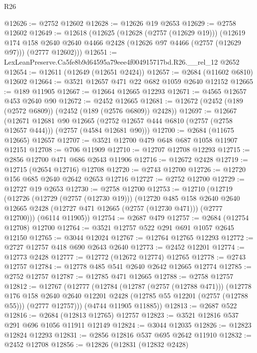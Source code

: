 \begin{lexlean}{R26}
\begin{coremodule}
@12626 := @2752 @12602
@12628 := @12626 @19 @2653
@12629 := @2758 @12602
@12649 := @12618
    (@12625
      (@12628 (@2757 (@12629 @19)))
      (@12619
        @174
        @158
        @2640
        @2640
        @4466
        @2428
        (@12626 @97 @4466 (@2757 (@12629 @97)))
        (@2777 @12602)))
@12651 := LexLeanPreserve.Ca5fe8b9d64595a79eee4f004915717bd.R26.__rel_12 @2652
@12654 := @12611 (@12649 (@12651 @2424))
@12657 := @2684 (@11602 @6810) @12602
@12664 := @3521 @12657 @471 @22 @682 @1059 @2640 @12152
@12665 := @189 @11905
@12667 := @12664 @12665 @12293
@12671 := @4565 @12657 @453 @2640 @90
@12672 := @2452 @12665
@12681 := @12672 (@2452 (@189 (@2572 @6809)) (@2452 (@189 (@2576 @6809)) @2428))
@12697 := @12667
    (@12671
      @12681
      @90
      @12665
      (@2752 @12657 @444 @6810 (@2757 (@2758 @12657 @444)))
      (@2757 (@4584 @12681 @90)))
@12700 := @2684 (@11675 @12665) @12657
@12707 := @3521 @12700 @479 @648 @687 @1058 @11907 @12151
@12708 := @706 @11909
@12710 := @12707 @12708 @12293
@12715 := @2856 @12700 @471 @686 @2643 @11906
@12716 := @12672 @2428
@12719 := @12715 (@2654 @12716) @12708
@12720 := @2743 @12700
@12726 := @12720 @156 @685 @2640 @2642 @2653 @12716
@12727 := @2752 @12700
@12729 := @12727 @19 @2653
@12730 := @2758 @12700
@12753 := @12710
    (@12719
      (@12726
        (@12729 (@2757 (@12730 @19)))
        (@12720
          @485
          @158
          @2640
          @2640
          @12665
          @2428
          (@12727 @471 @12665 (@2757 (@12730 @471)))
          (@2777 @12700)))
      (@6114 @11905))
@12754 := @2687 @479
@12757 := @2684 (@12754 @12708) @12700
@12764 := @3521 @12757 @522 @291 @691 @1057 @2645 @12150
@12765 := @3044 @12024
@12767 := @12764 @12765 @12293
@12772 := @2727 @12757 @418 @690 @2643 @2640
@12773 := @2452 @12201
@12774 := @12773 @2428
@12777 := @12772 (@12672 @12774) @12765
@12778 := @2743 @12757
@12784 := @12778 @485 @541 @2640 @2642 @12665 @12774
@12785 := @2752 @12757
@12787 := @12785 @471 @12665
@12788 := @2758 @12757
@12812 := @12767
    (@12777
      (@12784
        (@12787 (@2757 (@12788 @471)))
        (@12778
          @176
          @158
          @2640
          @2640
          @12201
          @2428
          (@12785 @55 @12201 (@2757 (@12788 @55)))
          (@2777 @12757)))
      (@4744 @11905 @11885))
@12813 := @2687 @522
@12816 := @2684 (@12813 @12765) @12757
@12823 := @3521 @12816 @537 @291 @696 @1056 @11911 @12149
@12824 := @3044 @12035
@12826 := @12823 @12824 @12293
@12831 := @2856 @12816 @537 @695 @2642 @11910
@12832 := @2452 @12708
@12856 := @12826
    (@12831
      (@12832 @2428)

\end{coremodule}
\end{lexlean}
